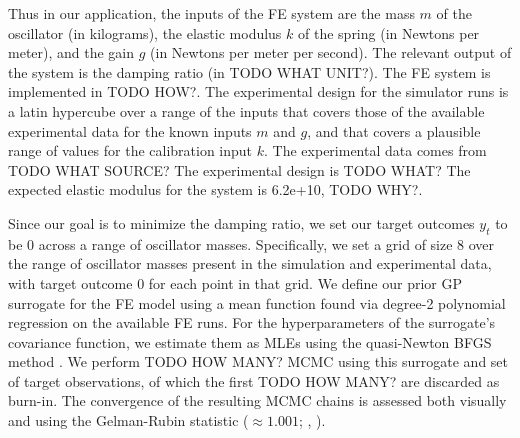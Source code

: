 \documentclass[12pt]{article}
\begin{document}
%
Thus in our application, the inputs of the FE system are the mass $m$ of the oscillator (in kilograms), the elastic modulus $k$ of the spring (in Newtons per meter), and the gain $g$ (in Newtons per meter per second).
%
The relevant output of the system is the damping ratio (in TODO WHAT UNIT?).
%
The FE system is implemented in TODO HOW?.
%
The experimental design for the simulator runs is a latin hypercube over a range of the inputs that covers those of the available experimental data for the known inputs $m$ and $g$, and that covers a plausible range of values for the calibration input $k$.
%
The experimental data comes from TODO WHAT SOURCE?
%
The experimental design is TODO WHAT?
%
The expected elastic modulus for the system is 6.2e+10, TODO WHY?.
%

%
Since our goal is to minimize the damping ratio, we set our target outcomes $y_t$ to be 0 across a range of oscillator masses.
%
Specifically, we set a grid of size 8 over the range of oscillator masses present in the simulation and experimental data, with target outcome 0 for each point in that grid.
%
We define our prior GP surrogate for the FE model using a mean function found via degree-2 polynomial regression on the available FE runs.
%
For the hyperparameters of the surrogate's covariance function, we estimate them as MLEs using the quasi-Newton BFGS method \citep{Fletcher2013}.
%
We perform TODO HOW MANY? MCMC using this surrogate and set of target observations, of which the first TODO HOW MANY? are discarded as burn-in.
%
The convergence of the resulting MCMC chains is assessed both visually and using the Gelman-Rubin statistic ($\approx1.001$; \citeauthor{Gelman1992a}, \citeyear{Gelman1992a}).
%

%
\end{document}

